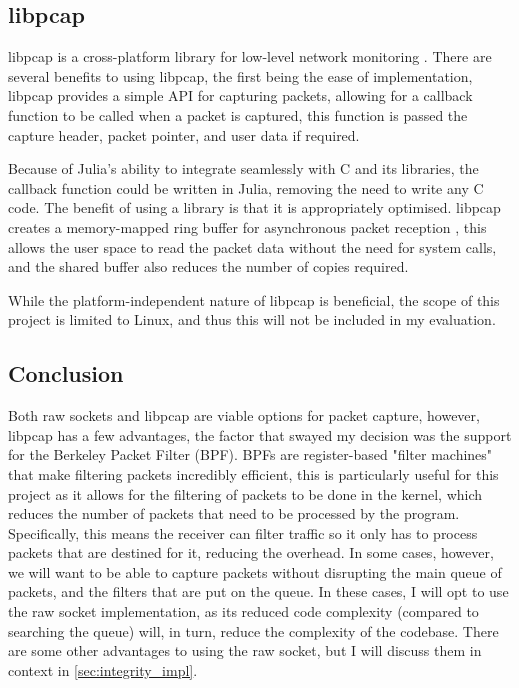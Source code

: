 \subsection{libpcap}

libpcap is a cross-platform library for low-level network monitoring \citep{libpcap}. 
There are several benefits to using libpcap, the first being the ease of implementation, libpcap provides a simple API for capturing packets, allowing for a callback function to be called when a packet is captured, this function is passed the capture header, packet pointer, and user data if required.

Because of Julia's ability to integrate seamlessly with C and its libraries, the callback function could be written in Julia, removing the need to write any C code. The benefit of using a library is that it is appropriately optimised. libpcap creates a memory-mapped ring buffer for asynchronous packet reception \citep{packet_7}, this allows the user space to read the packet data without the need for system calls, and the shared buffer also reduces the number of copies required.

While the platform-independent nature of libpcap is beneficial, the scope of this project is limited to Linux, and thus this will not be included in my evaluation.

\subsection{Conclusion}

Both raw sockets and libpcap are viable options for packet capture, however, libpcap has a few advantages, the factor that swayed my decision was the support for the Berkeley Packet Filter (BPF). BPFs are register-based "filter machines" \citep{BPF} that make filtering packets incredibly efficient, this is particularly useful for this project as it allows for the filtering of packets to be done in the kernel, which reduces the number of packets that need to be processed by the program. Specifically, this means the receiver can filter traffic so it only has to process packets that are destined for it, reducing the overhead. In some cases, however, we will want to be able to capture packets without disrupting the main queue of packets, and the filters that are put on the queue. In these cases, I will opt to use the raw socket implementation, as its reduced code complexity (compared to searching the queue) will, in turn, reduce the complexity of the codebase. There are some other advantages to using the raw socket, but I will discuss them in context in \ref{sec:integrity_impl}.

